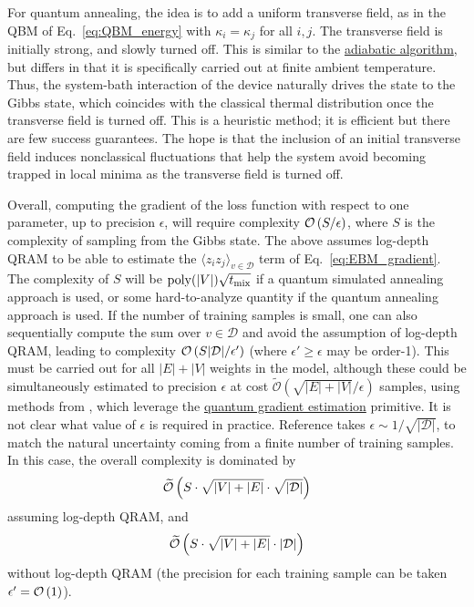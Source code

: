 \begin{refsection}
For quantum annealing, the idea is to add a uniform transverse field, as in the QBM of Eq.~\eqref{eq:QBM_energy} with $\kappa_i=\kappa_j$ for all $i,j$. The transverse field is initially strong, and slowly turned off. This is similar to the \hyperref[prim:QuantumAdiabaticAlgorithm]{adiabatic algorithm}, but differs in that it is specifically carried out at finite ambient temperature. Thus, the system-bath interaction of the device naturally drives the state to the Gibbs state, which coincides with the classical thermal distribution once the transverse field is turned off. This is a heuristic method; it is efficient but there are few success guarantees. The hope is that the inclusion of an initial transverse field induces nonclassical fluctuations that help the system avoid becoming trapped in local minima as the transverse field is turned off.

Overall, computing the gradient of the loss function with respect to one parameter, up to precision $\epsilon$, will require complexity $\mathcal{O}\left(  S/\epsilon \right)$,
where $S$ is the complexity of sampling from the Gibbs state. The above assumes log-depth QRAM to be able to estimate the $\langle z_i z_j \rangle_{v \in \mathcal{D}}$ term of Eq.~\eqref{eq:EBM_gradient}. The complexity of $S$ will be $\mathrm{poly}(|V|)\sqrt{t_{\rm mix}}$ if a quantum simulated annealing approach is used, or some hard-to-analyze quantity if the quantum annealing approach is used. If the number of training samples is small, one can also sequentially compute the sum over $v \in \mathcal{D}$ and avoid the assumption of log-depth QRAM, leading to complexity $\mathcal{O}\left( S\lvert \mathcal{D} \rvert/\epsilon' \right)$ (where $\epsilon' \geq \epsilon$ may be order-1). This must be carried out for all $|E|+|V|$ weights in the model, although these could be simultaneously estimated to precision $\epsilon$ at cost $\tilde{\mathcal{O}}(\sqrt{|E|+|V|}/\epsilon)$ samples, using methods from \cite{huggins2022ExpectationValue}, which leverage the \hyperref[prim:GradientEstimation]{quantum gradient estimation} primitive. 
It is not clear what value of $\epsilon$ is required in practice. Reference \cite{wiebe2014quantum} takes $\epsilon \sim 1/\sqrt{\lvert \mathcal{D} \rvert}$, to match the natural uncertainty coming from a finite number of training samples. In this case, the overall complexity is dominated by
\begin{equation}
    \widetilde{\mathcal{O}}\left( S \cdot \sqrt{|V|+|E|} \cdot \sqrt{|\mathcal{D}|}  \right)
\end{equation}
assuming log-depth QRAM, and 
\begin{equation}
    \widetilde{\mathcal{O}}\left( S \cdot \sqrt{|V|+|E|} \cdot |\mathcal{D}|  \right)
\end{equation}
without log-depth QRAM (the precision for each training sample can be taken $\epsilon' = \mathcal{O}\left( 1 \right)$).


\end{refsection}
